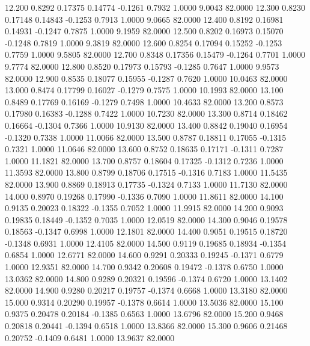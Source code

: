   12.200   0.8292   0.17375   0.14774  -0.1261   0.7932   1.0000   9.0043  82.0000
  12.300   0.8230   0.17148   0.14843  -0.1253   0.7913   1.0000   9.0665  82.0000
  12.400   0.8192   0.16981   0.14931  -0.1247   0.7875   1.0000   9.1959  82.0000
  12.500   0.8202   0.16973   0.15070  -0.1248   0.7819   1.0000   9.3819  82.0000
  12.600   0.8254   0.17094   0.15252  -0.1253   0.7759   1.0000   9.5805  82.0000
  12.700   0.8348   0.17356   0.15479  -0.1264   0.7701   1.0000   9.7774  82.0000
  12.800   0.8520   0.17973   0.15793  -0.1285   0.7647   1.0000   9.9573  82.0000
  12.900   0.8535   0.18077   0.15955  -0.1287   0.7620   1.0000  10.0463  82.0000
  13.000   0.8474   0.17799   0.16027  -0.1279   0.7575   1.0000  10.1993  82.0000
  13.100   0.8489   0.17769   0.16169  -0.1279   0.7498   1.0000  10.4633  82.0000
  13.200   0.8573   0.17980   0.16383  -0.1288   0.7422   1.0000  10.7230  82.0000
  13.300   0.8714   0.18462   0.16664  -0.1304   0.7366   1.0000  10.9130  82.0000
  13.400   0.8842   0.19040   0.16954  -0.1320   0.7338   1.0000  11.0066  82.0000
  13.500   0.8787   0.18811   0.17055  -0.1315   0.7321   1.0000  11.0646  82.0000
  13.600   0.8752   0.18635   0.17171  -0.1311   0.7287   1.0000  11.1821  82.0000
  13.700   0.8757   0.18604   0.17325  -0.1312   0.7236   1.0000  11.3593  82.0000
  13.800   0.8799   0.18706   0.17515  -0.1316   0.7183   1.0000  11.5435  82.0000
  13.900   0.8869   0.18913   0.17735  -0.1324   0.7133   1.0000  11.7130  82.0000
  14.000   0.8970   0.19268   0.17990  -0.1336   0.7090   1.0000  11.8611  82.0000
  14.100   0.9135   0.20023   0.18322  -0.1355   0.7052   1.0000  11.9915  82.0000
  14.200   0.9093   0.19835   0.18449  -0.1352   0.7035   1.0000  12.0519  82.0000
  14.300   0.9046   0.19578   0.18563  -0.1347   0.6998   1.0000  12.1801  82.0000
  14.400   0.9051   0.19515   0.18720  -0.1348   0.6931   1.0000  12.4105  82.0000
  14.500   0.9119   0.19685   0.18934  -0.1354   0.6854   1.0000  12.6771  82.0000
  14.600   0.9291   0.20333   0.19245  -0.1371   0.6779   1.0000  12.9351  82.0000
  14.700   0.9342   0.20608   0.19472  -0.1378   0.6750   1.0000  13.0362  82.0000
  14.800   0.9289   0.20321   0.19596  -0.1374   0.6720   1.0000  13.1402  82.0000
  14.900   0.9280   0.20217   0.19757  -0.1374   0.6668   1.0000  13.3180  82.0000
  15.000   0.9314   0.20290   0.19957  -0.1378   0.6614   1.0000  13.5036  82.0000
  15.100   0.9375   0.20478   0.20184  -0.1385   0.6563   1.0000  13.6796  82.0000
  15.200   0.9468   0.20818   0.20441  -0.1394   0.6518   1.0000  13.8366  82.0000
  15.300   0.9606   0.21468   0.20752  -0.1409   0.6481   1.0000  13.9637  82.0000
